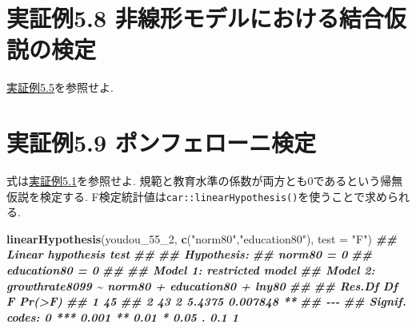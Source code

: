 \documentclass[
]{book}
\newenvironment{Shaded}{\begin{snugshade}}{\end{snugshade}}
\newcommand{\AttributeTok}[1]{\textcolor[rgb]{0.13,0.29,0.53}{#1}}
\newcommand{\DocumentationTok}[1]{\textcolor[rgb]{0.56,0.35,0.01}{\textbf{\textit{#1}}}}
\newcommand{\FunctionTok}[1]{\textcolor[rgb]{0.13,0.29,0.53}{\textbf{#1}}}
\newcommand{\NormalTok}[1]{#1}
\newcommand{\StringTok}[1]{\textcolor[rgb]{0.31,0.60,0.02}{#1}}
\begin{document}
\hypertarget{ux5b9fux8a3cux4f8b5.8-ux975eux7ddaux5f62ux30e2ux30c7ux30ebux306bux304aux3051ux308bux7d50ux5408ux4eeeux8aacux306eux691cux5b9a}{%
\section*{実証例5.8 非線形モデルにおける結合仮説の検定}\label{ux5b9fux8a3cux4f8b5.8-ux975eux7ddaux5f62ux30e2ux30c7ux30ebux306bux304aux3051ux308bux7d50ux5408ux4eeeux8aacux306eux691cux5b9a}}

\protect\hyperlink{ex5.5}{実証例5.5}を参照せよ.

\hypertarget{ux5b9fux8a3cux4f8b5.9-ux30ddux30f3ux30d5ux30a7ux30edux30fcux30cbux691cux5b9a}{%
\section*{実証例5.9 ポンフェローニ検定}\label{ux5b9fux8a3cux4f8b5.9-ux30ddux30f3ux30d5ux30a7ux30edux30fcux30cbux691cux5b9a}}

式は\protect\hyperlink{ex5.1}{実証例5.1}を参照せよ. 規範と教育水準の係数が両方とも0であるという帰無仮説を検定する. F検定統計値は\texttt{car::linearHypothesis()}を使うことで求められる.

\begin{Shaded}
\begin{Highlighting}[]
\FunctionTok{linearHypothesis}\NormalTok{(youdou\_55\_2, }\FunctionTok{c}\NormalTok{(}\StringTok{"norm80"}\NormalTok{,}\StringTok{"education80"}\NormalTok{), }\AttributeTok{test =} \StringTok{"F"}\NormalTok{)}
\DocumentationTok{\#\# Linear hypothesis test}
\DocumentationTok{\#\# }
\DocumentationTok{\#\# Hypothesis:}
\DocumentationTok{\#\# norm80 = 0}
\DocumentationTok{\#\# education80 = 0}
\DocumentationTok{\#\# }
\DocumentationTok{\#\# Model 1: restricted model}
\DocumentationTok{\#\# Model 2: growthrate8099 \textasciitilde{} norm80 + education80 + lny80}
\DocumentationTok{\#\# }
\DocumentationTok{\#\#   Res.Df Df      F   Pr(\textgreater{}F)   }
\DocumentationTok{\#\# 1     45                      }
\DocumentationTok{\#\# 2     43  2 5.4375 0.007848 **}
\DocumentationTok{\#\# {-}{-}{-}}
\DocumentationTok{\#\# Signif. codes:  0 \textquotesingle{}***\textquotesingle{} 0.001 \textquotesingle{}**\textquotesingle{} 0.01 \textquotesingle{}*\textquotesingle{} 0.05 \textquotesingle{}.\textquotesingle{} 0.1 \textquotesingle{} \textquotesingle{} 1}
\end{Highlighting}
\end{Shaded}
\end{document}

